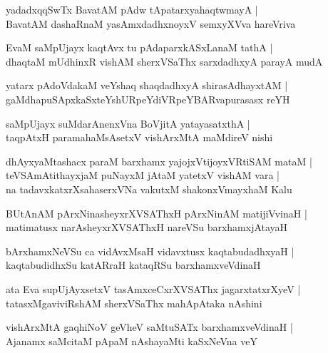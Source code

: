 \documentclass[twoside,12pt,openright]{book}
\newcounter{shloka}[chapter]
\begin{document}
\begin{shloka}
yadadxqqSwTx BavatAM pAdw tApatarxyahaqtwmayA |\\
BavatAM dashaRnaM yasAmxdadhxnoyxV semxyXVva hareVriva
\end{shloka}

\begin{shloka}
EvaM saMpUjayx kaqtAvx tu pAdaparxkASxLanaM tathA |\\
dhaqtaM mUdhinxR vishAM sherxVSaThx sarxdadhxyA parayA mudA 
\end{shloka}

\begin{shloka}
yatarx pAdoVdakaM veYshaq shaqdadhxyA shirasAdhayxtAM |\\
gaMdhapuSApxkaSxteYshURpeYdiVRpeYBARvapurasasx reYH
\end{shloka}

\begin{shloka}
saMpUjayx suMdarAnenxVna BoVjitA yatayasatxthA |\\
taqpAtxH paramahaMsAsetxV vishArxMtA maMdireV nishi 
\end{shloka}

\begin{shloka}
dhAyxyaMtashacx paraM barxhamx yajojxVtijoyxVRtiSAM mataM  |\\
teVSAmAtithayxjaM puNayxM jAtaM yatetxV vishAM vara |\\
na tadavxkatxrXsahaserxVNa vakutxM shakonxVmayxhaM Kalu 
\end{shloka}

\begin{shloka}
BUtAnAM pArxNinasheyxrXVSAThxH pArxNinAM matijiVvinaH |\\
matimatusx narAsheyxrXVSAThxH nareVSu barxhamxjAtayaH 
\end{shloka}

\begin{shloka}
bArxhamxNeVSu ca vidAvxMsaH vidavxtusx kaqtabudadhxyaH |\\
kaqtabudidhxSu katARraH kataqRSu barxhamxveVdinaH 
\end{shloka}

\begin{shloka}
ata Eva supUjAyxsetxV tasAmxceCxrXVSAThx jagarxtatxrXyeV |\\
tatasxMgaviviRshAM sherxVSaThx  mahApAtaka nAshini 
\end{shloka}

\begin{shloka}
vishArxMtA gaqhiNoV geVheV saMtuSATx barxhamxveVdinaH |\\
Ajanamx saMcitaM pApaM nAshayaMti kaSxNeVna veY 
\end{shloka}
\end{document}
